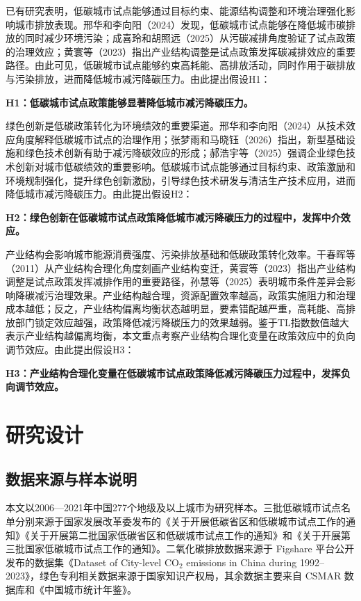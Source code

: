 \documentclass[12pt,a4paper]{ctexart}
\begin{document}
已有研究表明，低碳城市试点能够通过目标约束、能源结构调整和环境治理强化影响城市排放表现。邢华和李向阳（2024）发现，低碳城市试点能够在降低城市碳排放的同时减少环境污染；成喜玲和胡照远（2025）从污碳减排角度验证了试点政策的治理效应；黄寰等（2023）指出产业结构调整是试点政策发挥碳减排效应的重要路径。由此可见，低碳城市试点能够约束高耗能、高排放活动，同时作用于碳排放与污染排放，进而降低城市减污降碳压力。由此提出假设H1：

\noindent\textbf{\heiti H1：低碳城市试点政策能够显著降低城市减污降碳压力。}

绿色创新是低碳政策转化为环境绩效的重要渠道。邢华和李向阳（2024）从技术效应角度解释低碳城市试点的治理作用；张梦雨和马晓钰（2026）指出，新型基础设施和绿色技术创新有助于减污降碳效应的形成；郝浩宇等（2025）强调企业绿色技术创新对城市低碳绩效的重要影响。低碳城市试点能够通过目标约束、政策激励和环境规制强化，提升绿色创新激励，引导绿色技术研发与清洁生产技术应用，进而降低城市减污降碳压力。由此提出假设H2：

\noindent\textbf{\heiti H2：绿色创新在低碳城市试点政策降低城市减污降碳压力的过程中，发挥中介效应。}

产业结构会影响城市能源消费强度、污染排放基础和低碳政策转化效率。干春晖等（2011）从产业结构合理化角度刻画产业结构变迁，黄寰等（2023）指出产业结构调整是试点政策发挥减排作用的重要路径，孙慧等（2025）表明城市条件差异会影响降碳减污治理效果。产业结构越合理，资源配置效率越高，政策实施阻力和治理成本越低；反之，产业结构偏离均衡状态越明显，要素错配越严重，高耗能、高排放部门锁定效应越强，政策降低减污降碳压力的效果越弱。鉴于TL指数数值越大表示产业结构越偏离均衡，本文重点考察产业结构合理化变量在政策效应中的负向调节效应。由此提出假设H3：

\noindent\textbf{\heiti H3：产业结构合理化变量在低碳城市试点政策降低减污降碳压力过程中，发挥负向调节效应。}
\section{研究设计}

\subsection{数据来源与样本说明}

本文以2006—2021年中国277个地级及以上城市为研究样本。三批低碳城市试点名单分别来源于国家发展改革委发布的《关于开展低碳省区和低碳城市试点工作的通知》《关于开展第二批国家低碳省区和低碳城市试点工作的通知》和《关于开展第三批国家低碳城市试点工作的通知》。二氧化碳排放数据来源于 Figshare 平台公开发布的数据集《Dataset of City-level CO$_2$ emissions in China during 1992--2023》，绿色专利相关数据来源于国家知识产权局，其余数据主要来自 CSMAR 数据库和《中国城市统计年鉴》。
\end{document}
